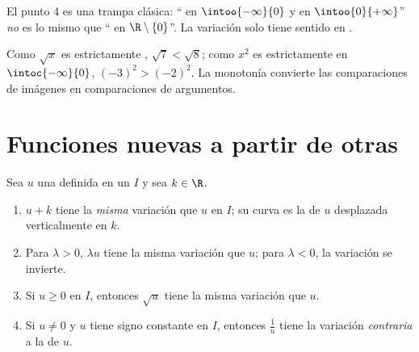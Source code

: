 \begin{remark}
El punto 4 es una trampa clásica: `` en $\intoo{-\infty}{0}$ y
en $\intoo{0}{+\infty}$'' \emph{no} es lo mismo que `` en
$\R \setminus \{0\}$''. La variación solo tiene sentido en .
\end{remark}

\begin{example}
Como $\sqrt x$ es estrictamente , $\sqrt{7} < \sqrt{8}$; como
$x^2$ es estrictamente  en $\intoc{-\infty}{0}$,
$(-3)^2 > (-2)^2$. La monotonía convierte las comparaciones de imágenes en
comparaciones de argumentos.
\end{example}

\section{Funciones nuevas a partir de otras}

\begin{proposition}[Transformaciones]\label{prop:g11:func:transforms}
Sea $u$ una  definida en un  $I$ y sea $k \in \R$.
\begin{enumerate}
  \item $u + k$ tiene la \emph{misma} variación que $u$ en $I$; su curva
        es la de $u$ desplazada verticalmente en $k$.
  \item Para $\lambda > 0$, $\lambda u$ tiene la misma variación que $u$;
        para $\lambda < 0$, la variación se invierte.
  \item Si $u \geq 0$ en $I$, entonces $\sqrt u$ tiene la misma variación
        que $u$.
  \item Si $u \neq 0$ y $u$ tiene signo constante en $I$, entonces
        $\frac1u$ tiene la variación \emph{contraria} a la de $u$.
\end{enumerate}
\end{proposition}


